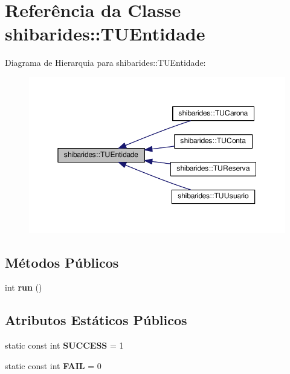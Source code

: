 \hypertarget{classshibarides_1_1TUEntidade}{}\section{Referência da Classe shibarides\+:\+:T\+U\+Entidade}
\label{classshibarides_1_1TUEntidade}


Diagrama de Hierarquia para shibarides\+:\+:T\+U\+Entidade\+:
\nopagebreak
\begin{figure}[H]
\begin{center}
\leavevmode
\includegraphics[width=350pt]{classshibarides_1_1TUEntidade__inherit__graph}
\end{center}
\end{figure}
\subsection*{Métodos Públicos}
\begin{DoxyCompactItemize}
\item 
int {\bfseries run} ()\hypertarget{classshibarides_1_1TUEntidade_a86646bd0263445275e009ae9e80758bc}{}\label{classshibarides_1_1TUEntidade_a86646bd0263445275e009ae9e80758bc}

\end{DoxyCompactItemize}
\subsection*{Atributos Estáticos Públicos}
\begin{DoxyCompactItemize}
\item 
static const int {\bfseries S\+U\+C\+C\+E\+SS} = 1\hypertarget{classshibarides_1_1TUEntidade_ab1f69b1700e2503ffaf55319cdac69dd}{}\label{classshibarides_1_1TUEntidade_ab1f69b1700e2503ffaf55319cdac69dd}

\item 
static const int {\bfseries F\+A\+IL} = 0\hypertarget{classshibarides_1_1TUEntidade_a8868068262635c3026d36ec91062545a}{}\label{classshibarides_1_1TUEntidade_a8868068262635c3026d36ec91062545a}

\end{DoxyCompactItemize}
